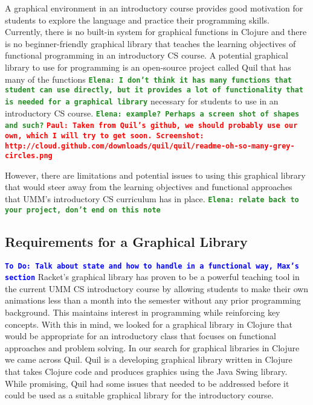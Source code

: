 \documentclass[12pt]{article}
\newcommand{\comment}[1]{{\bf \tt  {#1}}}
\newcommand{\emcomment}[1]{\textcolor{ForestGreen}{\comment{Elena: {#1}}}}
\newcommand{\todo}[1]{\textcolor{blue}{\comment{To Do: {#1}}}}
\newcommand{\pscomment}[1]{\textcolor{red}{\comment{Paul: {#1}}}}
\begin{document}
A graphical environment in an introductory course provides good motivation for students to explore the language and practice their programming skills. Currently, there is no built-in system for graphical functions in Clojure and there is no beginner-friendly graphical library that teaches the learning objectives of functional programming in an introductory CS course. A potential graphical library to use for programming is an open-source project called Quil that has many of the functions \emcomment{I don't think it has many functions that student can use directly, but it provides a lot of functionality that is needed for a graphical library} necessary for students to use in an introductory CS course.
\emcomment{example? Perhaps a screen shot of shapes and such?}
\pscomment{Taken from Quil's github, we should probably use our own, which I will try to get soon.  Screenshot: http://cloud.github.com/downloads/quil/quil/readme-oh-so-many-grey-circles.png}

However, there are limitations and potential issues to using this graphical library that would steer away from the learning objectives and functional approaches that UMM's introductory CS curriculum has in place.
\emcomment{relate back to your project, don't end on this note}


\subsection{Requirements for a Graphical Library}\label{subsec:requirements}
\todo{Talk about state and how to handle in a functional way, Max's section}
Racket's graphical library has proven to be a powerful teaching tool in the current UMM CS introductory course by allowing students to make their own animations less than a month into the semester without any prior programming background. This maintains interest in programming while reinforcing key concepts. With this in mind, we looked for a graphical library in Clojure that would be appropriate for an introductory class that focuses on functional approaches and problem solving. In our search for graphical libraries in Clojure we came across Quil. Quil is a developing graphical library written in Clojure that takes Clojure code and produces graphics using the Java Swing library. While promising, Quil had some issues that needed to be addressed before it could be used as a suitable graphical library for the introductory course.
\end{document}
